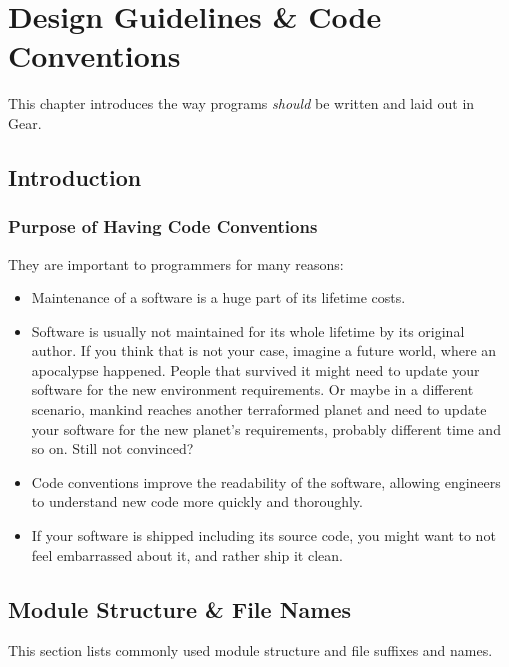 
\chapter{Design Guidelines \& Code Conventions}

This chapter introduces the way programs {\em should} be written and laid out in Gear. 






\section{Introduction}

\subsection{Purpose of Having Code Conventions}

They are important to programmers for many reasons:
\begin{itemize}
\item Maintenance of a software is a huge part of its lifetime costs. 
\item Software is usually not maintained for its whole lifetime by its original author. If you think that is not your case, imagine a future world, where an apocalypse happened. People that survived it might need to update your software for the new environment requirements. Or maybe in a different scenario, mankind reaches another terraformed planet and need to update your software for the new planet’s requirements, probably different time and so on. Still not convinced? 
\item Code conventions improve the readability of the software, allowing engineers to understand new code more quickly and thoroughly. 
\item If your software is shipped including its source code, you might want to not feel embarrassed about it, and rather ship it clean. 
\end{itemize}






\section{Module Structure \& File Names}

This section lists commonly used module structure and file suffixes and names. 

